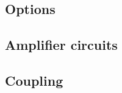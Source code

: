     \subsection*{}  

\subsection{Options}
\subsection{Amplifier circuits}
\subsection{Coupling} 

%             
%             
%             
%             
%             
\clearpage
